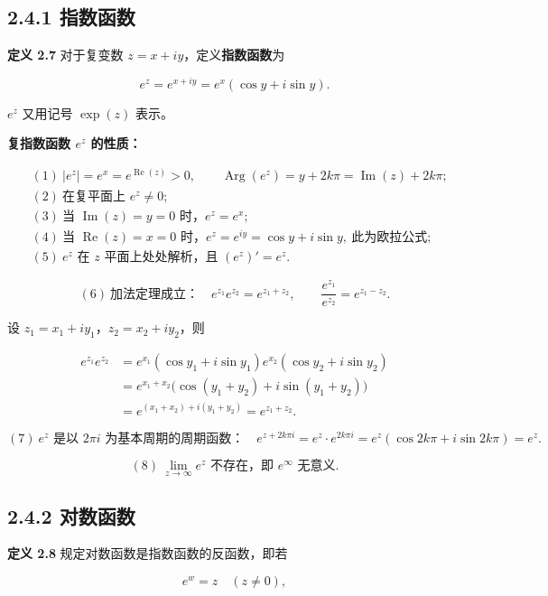 \subsection{2.4.1 指数函数}\label{ux6307ux6570ux51fdux6570}

\textbf{定义 2.7} 对于复变数 \(z=x+iy\)，定义\textbf{指数函数}为

\[
e^z=e^{x+iy}=e^x(\cos y+i\sin y).
\]

\(e^z\) 又用记号 \(\exp(z)\) 表示。

\textbf{复指数函数 \(e^z\) 的性质：}

\[
\begin{aligned}
&(1)\ |e^z|=e^x=e^{\operatorname{Re}(z)}>0,\qquad
\operatorname{Arg}(e^z)=y+2k\pi=\operatorname{Im}(z)+2k\pi;\\
&(2)\ \text{在复平面上 }e^z\neq 0;\\
&(3)\ \text{当 }\operatorname{Im}(z)=y=0\text{ 时，}e^z=e^x;\\
&(4)\ \text{当 }\operatorname{Re}(z)=x=0\text{ 时，}e^z=e^{iy}=\cos y+i\sin y,\ \text{此为欧拉公式};\\
&(5)\ e^z\text{ 在 }z\text{ 平面上处处解析，且 }(e^z)'=e^z.
\end{aligned}
\]

\[
(6)\ \text{加法定理成立：}\quad
e^{z_1}e^{z_2}=e^{z_1+z_2},\qquad
\frac{e^{z_1}}{e^{z_2}}=e^{z_1-z_2}.
\]

设 \(z_1=x_1+iy_1\)，\(z_2=x_2+iy_2\)，则

\[
\begin{aligned}
e^{z_1}e^{z_2}
&=e^{x_1}(\cos y_1+i\sin y_1)e^{x_2}(\cos y_2+i\sin y_2)\\
&=e^{x_1+x_2}\bigl(\cos(y_1+y_2)+i\sin(y_1+y_2)\bigr)\\
&=e^{(x_1+x_2)+i(y_1+y_2)}=e^{z_1+z_2}.
\end{aligned}
\]

\[
(7)\ e^z\text{ 是以 }2\pi i\text{ 为基本周期的周期函数：}\quad
e^{z+2k\pi i}=e^z\cdot e^{2k\pi i}=e^z(\cos 2k\pi+i\sin 2k\pi)=e^z.
\]

\[
(8)\ \lim_{z\to\infty}e^z\text{ 不存在，即 }e^\infty\text{ 无意义}.
\]

\subsection{2.4.2 对数函数}\label{ux5bf9ux6570ux51fdux6570}

\textbf{定义 2.8} 规定对数函数是指数函数的反函数，即若

\[
e^w=z\quad (z\neq 0),
\]


